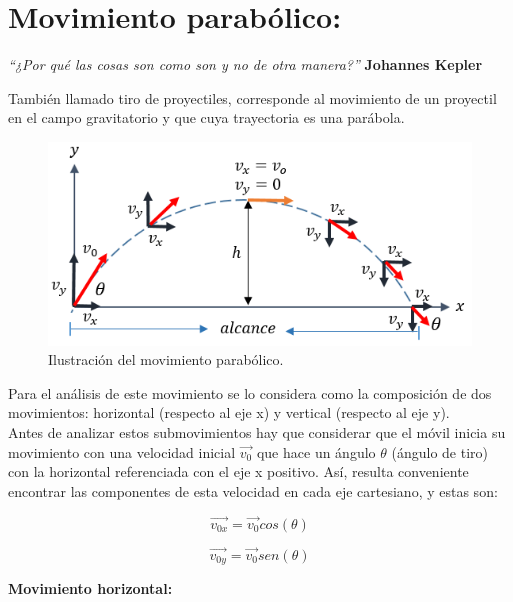 \documentclass[a5paper,pagesize,10pt,bibtotoc,pointlessnumbers,
normalheadings,DIV=9,fleqn,x11names,table,twoside=false]{scrbook}
\begin{document}
\chapter{Movimiento parabólico:} 
 
\textit{``¿Por qué las cosas son como son y no de otra manera?''} \textbf{Johannes Kepler}
\vspace{1.0cm}  
 
También llamado tiro de proyectiles, corresponde al movimiento de un proyectil en el campo gravitatorio y que cuya  trayectoria es 
una parábola.
 
\begin{figure}[ht]
 \centering
 \includegraphics[scale=0.6]{images/movimiento_parabolico.png}
 \caption{Ilustración del movimiento parabólico.}\label{movparabola}
\end{figure}   

Para el análisis de este movimiento se lo considera como la composición de dos movimientos: horizontal (respecto al eje x) y 
vertical (respecto al eje y).\\

Antes de analizar estos submovimientos hay que considerar que el móvil inicia su movimiento con una velocidad inicial $\vec{v_0}$ 
que hace un ángulo $\theta$ (ángulo de tiro) con la horizontal referenciada con el eje x positivo. Así, resulta conveniente 
encontrar las componentes de esta velocidad en cada eje cartesiano, y estas son:

\begin{equation}
 \vec{v_{0x}}=\vec{v_0}cos(\theta)
\end{equation}

\begin{equation}
 \vec{v_{0y}}=\vec{v_0}sen(\theta)
\end{equation}

\textbf{Movimiento horizontal:}\\
\end{document}
